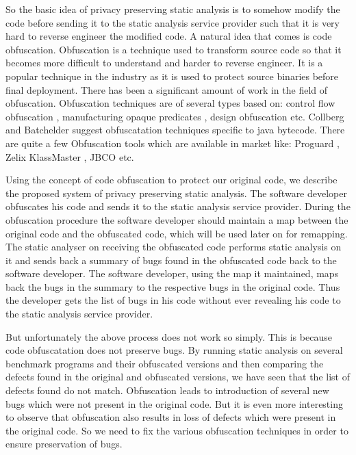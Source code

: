So the basic idea of privacy preserving static analysis is to somehow modify the code before sending it to the static analysis service provider such that it is very hard to reverse 
engineer the modified code. A natural idea that comes is code obfuscation. Obfuscation is a technique used to transform source code so that it becomes more difficult to understand 
and harder to reverse engineer. It is a popular technique in the industry as it is used to protect source binaries before final deployment. There has been a significant amount of work
in the field of obfuscation. Obfuscation techniques are of several types based on: control flow obfuscation \cite{controlflowobf}, manufacturing opaque predicates \cite{collberg}, 
design obfuscation \cite{designobf} etc. Collberg \cite{collberg} and Batchelder \cite{jbco} suggest obfuscatation techniques specific to java bytecode. There are quite a few 
Obfuscation tools which are available in market like: Proguard \cite{proguard}, Zelix KlassMaster \cite{zelix}, JBCO \cite{jbco}etc.

Using the concept of code obfuscation to protect our original code, we describe the proposed system of privacy preserving static analysis. The software developer obfuscates his code 
and sends it to the static analysis service provider. During the obfuscation procedure the software developer should maintain a map between the original code and the obfuscated code, 
which will be used later on for remapping. The static analyser on receiving the obfuscated code performs static analysis on it and sends back a summary of bugs found in the obfuscated 
code back to the software developer. The software developer, using the map it maintained, maps back the bugs in the summary to the respective bugs in the original code. Thus the 
developer gets the list of bugs in his code without ever revealing his code to the static analysis service provider.

But unfortunately the above process does not work so simply. This is because code obfuscatation does not preserve bugs. By running static analysis on several benchmark programs and 
their obfuscated versions and then comparing the defects found in the original and obfuscated versions, we have seen that the list of defects found do not match. Obfuscation leads to 
introduction of several new bugs which were not present in the original code. But it is even more interesting to observe that obfuscation also results in loss of defects which were 
present in the original code. So we need to fix the various obfuscation techniques in order to ensure preservation of bugs.

